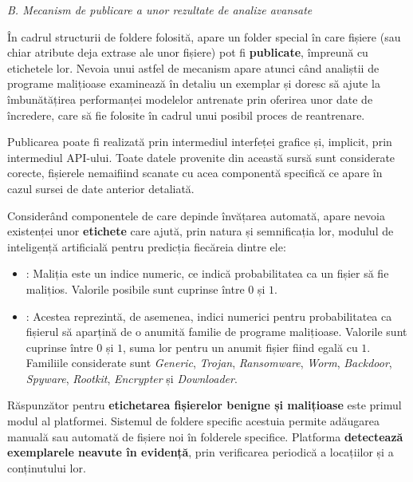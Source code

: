\documentclass[../../main.tex]{subfiles}
\begin{document}
\vspace{0.3cm}

\textit{B. Mecanism de publicare a unor rezultate de analize avansate}

În cadrul structurii de foldere folosită, apare un folder special în care fișiere (sau chiar atribute deja extrase ale unor fișiere) pot fi \textbf{publicate}, împreună cu etichetele lor. Nevoia unui astfel de mecanism apare atunci când analiștii de programe malițioase examinează în detaliu un exemplar și doresc să ajute la îmbunătățirea performanței modelelor antrenate prin oferirea unor date de încredere, care să fie folosite în cadrul unui posibil proces de reantrenare.

Publicarea poate fi realizată prin intermediul interfeței grafice și, implicit, prin intermediul API-ului. Toate datele provenite din această sursă sunt consi\-derate corecte, fișierele nemaifiind scanate cu acea componentă specifică ce apare în cazul sursei de date anterior detaliată.

Considerând componentele de care depinde învățarea automată, apare nevoia existenței unor \textbf{etichete} care ajută, prin natura și semnificația lor, modulul de inteligență artificială pentru predicția fiecăreia dintre ele:

\begin{itemize}
    \item {}: Maliția este un indice numeric, ce indică probabilitatea ca un fișier să fie malițios. Valorile posibile sunt cuprinse între $ 0 $ și $ 1 $.
    \item {}: Acestea reprezintă, de asemenea, indici numerici pentru probabilitatea ca fișierul să aparțină de o anumită familie de programe malițioase. Valorile sunt cuprinse între $ 0 $ și $ 1 $, suma lor pentru un anumit fișier fiind egală cu $ 1 $. Familiile considerate sunt \textit{Generic}, \textit{Trojan}, \textit{Ransomware}, \textit{Worm}, \textit{Backdoor}, \textit{Spyware}, \textit{Rootkit}, \textit{Encrypter} și \textit{Downloader}.
\end{itemize}

Răspunzător pentru \textbf{etichetarea fișierelor benigne și malițioase} este primul modul al platformei. Sistemul de foldere specific acestuia permite adău\-garea manuală sau automată de fișiere noi în folderele specifice. Platforma \textbf{detectează exemplarele neavute în evidență}, prin verificarea periodică a locațiilor și a conținutului lor.
\end{document}
